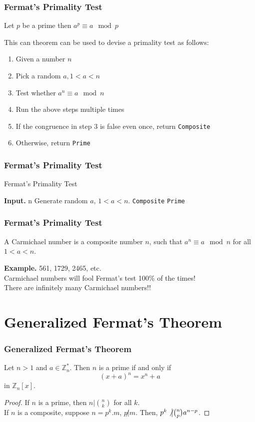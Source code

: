 \documentclass[11pt]{beamer}
\newcommand{\ZZ}{\mathbb{Z}}
\begin{document}
\begin{frame}
\frametitle{Fermat's Primality Test}
\begin{theorem}
  Let $p$ be a prime then $a^{p} \equiv a \mod p$
\end{theorem}
This can theorem can be used to devise a primality test as follows:
\begin{enumerate}
  \item Given a number $n$
  \item Pick a random $a, 1 < a < n$
  \item Test whether $a^n \equiv a \mod n$
  \item Run the above steps multiple times
  \item If the congruence in step 3 is false even once, return \texttt{Composite}
  \item Otherwise, return \texttt{Prime}
\end{enumerate}
\end{frame}

\begin{frame}
\frametitle{Fermat's Primality Test}
\begin{algorithm}[H]
\caption{Fermat's Primality Test}\label{alg:fermat}
\begin{algorithmic}[1]
  \State \textbf{Input.} n
  \State Generate random $a$, $1 < a < n$.
    \State \Return \texttt{Composite}
  \EndIf
  \EndFor
  \State \Return \texttt{Prime}
\end{algorithmic}
\end{algorithm}
\end{frame}

\begin{frame}
\frametitle{Fermat's Primality Test}
\begin{definition}
  A Carmichael number is a composite number $n$, such that
  $a^n \equiv a \mod n$ for all $1 < a < n$.
\end{definition}
\textbf{Example.} 561, 1729, 2465, etc.\\
\pause
Carmichael numbers will fool Fermat's test 100\% of the times!\\
\pause
There are infinitely many Carmichael numbers!!
\end{frame}

\section{Generalized Fermat's Theorem}
\begin{frame}
  \frametitle{Generalized Fermat's Theorem}
  \begin{theorem}
    Let $n > 1$ and $a \in \ZZ_n^*$. Then $n$ is a prime if and only if
  \[
    (x+a)^n = x^n + a
  \]
  in $\ZZ_n[x]$.
  \pause
  \begin{proof}
  If $n$ is a prime, then $n \big| {n \choose k}$ for all $k$.\\
  \pause
  If $n$ is a composite, suppose $n = p^k.m$, $p \not| m$. Then,
  $p^k \not\big| {n \choose  p}a^{n-p}$.
  \end{proof}
  \end{theorem}
\end{frame}
\end{document}
